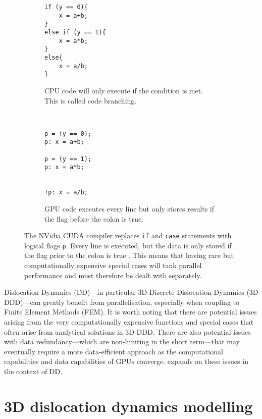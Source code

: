 \begin{figure}
  \centering
  \begin{subfigure}[t]{0.48\linewidth}
    \centering
    \begin{verbatim}
if (y == 0){
    x = a+b;
}
else if (y == 1){
    x = a*b;
}
else{
    x = a/b;
}
			\end{verbatim}
    \caption{CPU code will only execute if the condition is met. This is called code branching.}
  \end{subfigure}
  ~
  \begin{subfigure}[t]{0.48\linewidth}
    \centering
    \begin{verbatim}
p = (y == 0);
p: x = a+b;

p = (y == 1);
p: x = a*b;


!p: x = a/b;
			\end{verbatim}
    \vspace{12pt}
    \caption{GPU code executes every line but only stores results if the flag before the colon is true.}
  \end{subfigure}
  \caption[Explanation of warp divergence.]{The NVidia CUDA compiler replaces \texttt{if} and \texttt{case} statements with logical flags \texttt{p}. Every line is executed, but the data is only stored if the flag prior to the colon is true \cite{nvidia}. This means that having rare but computationally expensive special cases will tank parallel performance and must therefore be dealt with separately.}
  \label{f:code_branching}
\end{figure}

Dislocation Dynamics (DD)---in particular 3D Discrete Dislocation Dynamics (3D DDD)---can greatly benefit from parallelisation, especially when coupling to Finite Element Methods (FEM). It is worth noting that there are potential issues arising from the very computationally expensive functions and special cases that often arise from analytical solutions in 3D DDD. There are also potential issues with data redundancy---which are non-limiting in the short term---that may eventually require a more data-efficient approach as the computational capabilities and data capabilities of GPUs converge.  expands on these issues in the context of DD.

\section{3D dislocation dynamics modelling}
\label{s:3d_ddd}

